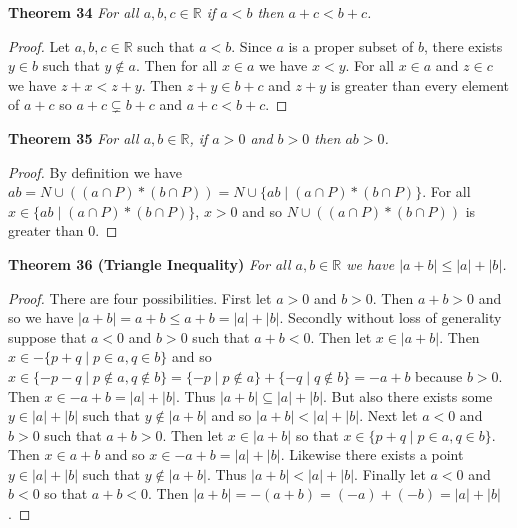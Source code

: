 \documentclass{article}
\begin{document}
\begin{flushleft}
\textbf{Theorem 34}
\textsl{For all $a,b,c \in \mathbb{R}$ if $a<b$ then $a+c<b+c$.}
\begin{proof}
Let $a,b,c \in \mathbb{R}$ such that $a<b$. Since $a$ is a proper subset of $b$, there exists $y \in b$ such that $y \notin a$. Then for all $x \in a$ we have $x<y$. For all $x \in a$ and $z \in c$ we have $z+x<z+y$. Then $z+y \in b+c$ and $z+y$ is greater than every element of $a+c$ so $a+c \subsetneq b+c$ and $a+c < b+c$.
\end{proof}

\textbf{Theorem 35}
\textsl{For all $a,b \in \mathbb{R}$, if $a > 0$ and $b > 0$ then $ab > 0$.}
\begin{proof}
By definition we have $ab=N \cup ((a \cap P) * (b \cap P))=N \cup \{ab \mid (a \cap P) * (b \cap P)\}$. For all $x \in \{ab \mid (a \cap P) * (b \cap P)\}$, $x>0$ and so $N \cup ((a \cap P) * (b \cap P))$ is greater than $0$.
\end{proof}

\textbf{Theorem 36 (Triangle Inequality)}
\textsl{For all $a,b \in \mathbb{R}$ we have $|a+b| \leq |a| + |b|$.}
\begin{proof}
There are four possibilities. First let $a>0$ and $b>0$. Then $a+b>0$ and so we have $|a+b| = a+b \leq a+b = |a| + |b|$. Secondly without loss of generality suppose that $a<0$ and $b>0$ such that $a+b<0$. Then let $x \in |a+b|$. Then $x \in -\{p+q \mid p \in a, q \in b\}$ and so $x \in \{-p-q \mid p \notin a, q \notin b\}=\{-p \mid p \notin a\} + \{-q \mid q \notin b\}=-a+b$ because $b>0$. Then $x \in -a + b=|a| + |b|$. Thus $|a+b| \subseteq |a| + |b|$. But also there exists some $y \in |a|+|b|$ such that $y \notin |a+b|$ and so $|a+b| < |a| + |b|$. Next let $a<0$ and $b>0$ such that $a+b>0$. Then let $x \in |a+b|$ so that $x \in \{p+q \mid p \in a, q \in b\}$. Then $x \in a+b$ and so $x \in -a + b=|a|+|b|$. Likewise there exists a point $y \in |a|+|b|$ such that $y \notin |a+b|$. Thus $|a+b| < |a|+|b|$. Finally let $a<0$ and $b<0$ so that $a+b<0$. Then $|a+b|=-(a+b)=(-a)+(-b)=|a|+|b|$.
\end{proof}

\end{flushleft}
\end{document}
